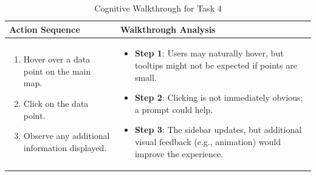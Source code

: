\begin{table}[H]
    \centering
    \begin{tabular}{p{} | p{}}
        \hline
        \textbf{Action Sequence} & \textbf{Walkthrough Analysis} \\
        \hline
        \begin{enumerate}
            \item Hover over a data point on the main map.
            \item Click on the data point.
            \item Observe any additional information displayed.
        \end{enumerate} &
        \begin{itemize}
            \item \textbf{Step 1}: Users may naturally hover, but tooltips might not be expected if points are small.
            \item \textbf{Step 2}: Clicking is not immediately obvious; a prompt could help.
            \item \textbf{Step 3}: The sidebar updates, but additional visual feedback (e.g., animation) would improve the experience.
        \end{itemize} \\
        \hline
    \end{tabular}
    \caption{Cognitive Walkthrough for Task 4}
    \label{tab:task4_walkthrough}
\end{table}
